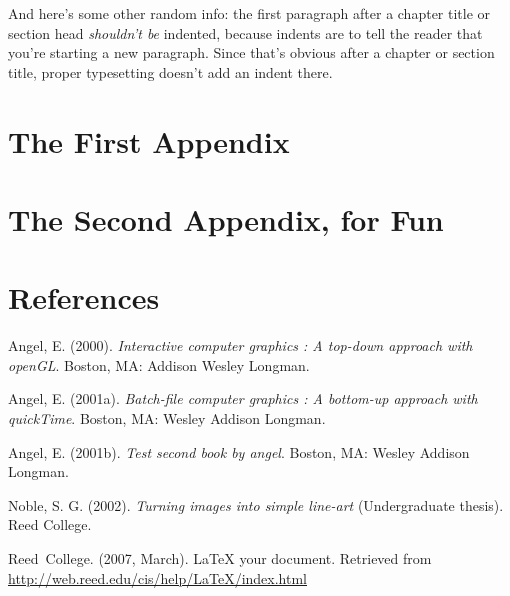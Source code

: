 \documentclass[12pt,twoside]{reedthesis}
\begin{document}
  And here's some other random info: the first paragraph after a chapter
  title or section head \emph{shouldn't be} indented, because indents are
  to tell the reader that you're starting a new paragraph. Since that's
  obvious after a chapter or section title, proper typesetting doesn't add
  an indent there.
  
  \appendix
  \chapter{The First Appendix} \chapter{The Second Appendix, for Fun}
  
  \backmatter
  
  \chapter{References}
  
  \noindent
  
  \setlength{\parindent}{-0.20in} \setlength{\leftskip}{0.20in}
  \setlength{\parskip}{8pt}
  
  Angel, E. (2000). \emph{Interactive computer graphics : A top-down
  approach with openGL}. Boston, MA: Addison Wesley Longman.
  
  Angel, E. (2001a). \emph{Batch-file computer graphics : A bottom-up
  approach with quickTime}. Boston, MA: Wesley Addison Longman.
  
  Angel, E. (2001b). \emph{Test second book by angel}. Boston, MA: Wesley
  Addison Longman.
  
  Noble, S. G. (2002). \emph{Turning images into simple line-art}
  (Undergraduate thesis). Reed College.
  
  Reed~College. (2007, March). LaTeX your document. Retrieved from
  \url{http://web.reed.edu/cis/help/LaTeX/index.html}



\end{document}
